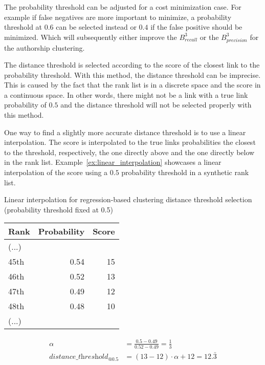 The probability threshold can be adjusted for a cost minimization case.
For example if false negatives are more important to minimize, a probability threshold at $0.6$ can be selected instead or $0.4$ if the false positive should be minimized.
Which will subsequently either improve the $B^3_{recall}$ or the $B^3_{precision}$ for the authorship clustering.

The distance threshold is selected according to the score of the closest link to the probability threshold.
With this method, the distance threshold can be imprecise.
This is caused by the fact that the rank list is in a discrete space and the score in a continuous space.
In other words, there might not be a link with a true link probability of $0.5$ and the distance threshold will not be selected properly with this method.

One way to find a slightly more accurate distance threshold is to use a linear interpolation.
The score is interpolated to the true links probabilities the closest to the threshold, respectively, the one directly above and the one directly below in the rank list.
Example~\ref{ex:linear_interpolation} showcases a linear interpolation of the score using a $0.5$ probability threshold in a synthetic rank list.

\begin{example}[!t]
  \centering
  \caption{Linear interpolation for regression-based clustering distance threshold selection (probability threshold fixed at 0.5)}
  \label{ex:linear_interpolation}

  \begin{subexample}{\linewidth}
    \centering
    \begin{tabular}{l r r}
      \toprule
      Rank & Probability & Score \\
      \midrule
      (...) & &\\
      45th & 0.54 & 15 \\
      46th & 0.52 & 13 \\
      47th & 0.49 & 12 \\
      48th & 0.48 & 10 \\
      (...) & & \\
      \bottomrule
    \end{tabular}
  \end{subexample}

  \vspace{0.5cm}

  \begin{subexample}{\linewidth}
    \centering
    \begin{align*}
        \alpha &= \frac{0.5 - 0.49}{0.52 - 0.49} = \frac{1}{3} \\
        \textit{distance\_threshold}_{@0.5} &= (13 - 12) \cdot \alpha + 12 = 12.\bar{3}
    \end{align*}
  \end{subexample}
\end{example}


